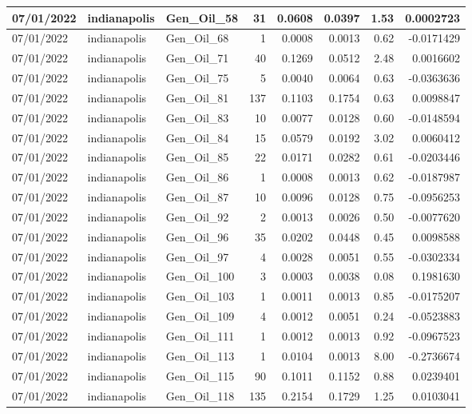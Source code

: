 \documentclass[
  letterpaper,
  DIV=11,
  numbers=noendperiod]{scrartcl}
\begin{document}
\begin{tabular}{l|l|l|r|r|r|r|r}
\hline
07/01/2022 & indianapolis & Gen\_Oil\_58 & 31 & 0.0608 & 0.0397 & 1.53 & 0.0002723\\
\hline
07/01/2022 & indianapolis & Gen\_Oil\_68 & 1 & 0.0008 & 0.0013 & 0.62 & -0.0171429\\
\hline
07/01/2022 & indianapolis & Gen\_Oil\_71 & 40 & 0.1269 & 0.0512 & 2.48 & 0.0016602\\
\hline
07/01/2022 & indianapolis & Gen\_Oil\_75 & 5 & 0.0040 & 0.0064 & 0.63 & -0.0363636\\
\hline
07/01/2022 & indianapolis & Gen\_Oil\_81 & 137 & 0.1103 & 0.1754 & 0.63 & 0.0098847\\
\hline
07/01/2022 & indianapolis & Gen\_Oil\_83 & 10 & 0.0077 & 0.0128 & 0.60 & -0.0148594\\
\hline
07/01/2022 & indianapolis & Gen\_Oil\_84 & 15 & 0.0579 & 0.0192 & 3.02 & 0.0060412\\
\hline
07/01/2022 & indianapolis & Gen\_Oil\_85 & 22 & 0.0171 & 0.0282 & 0.61 & -0.0203446\\
\hline
07/01/2022 & indianapolis & Gen\_Oil\_86 & 1 & 0.0008 & 0.0013 & 0.62 & -0.0187987\\
\hline
07/01/2022 & indianapolis & Gen\_Oil\_87 & 10 & 0.0096 & 0.0128 & 0.75 & -0.0956253\\
\hline
07/01/2022 & indianapolis & Gen\_Oil\_92 & 2 & 0.0013 & 0.0026 & 0.50 & -0.0077620\\
\hline
07/01/2022 & indianapolis & Gen\_Oil\_96 & 35 & 0.0202 & 0.0448 & 0.45 & 0.0098588\\
\hline
07/01/2022 & indianapolis & Gen\_Oil\_97 & 4 & 0.0028 & 0.0051 & 0.55 & -0.0302334\\
\hline
07/01/2022 & indianapolis & Gen\_Oil\_100 & 3 & 0.0003 & 0.0038 & 0.08 & 0.1981630\\
\hline
07/01/2022 & indianapolis & Gen\_Oil\_103 & 1 & 0.0011 & 0.0013 & 0.85 & -0.0175207\\
\hline
07/01/2022 & indianapolis & Gen\_Oil\_109 & 4 & 0.0012 & 0.0051 & 0.24 & -0.0523883\\
\hline
07/01/2022 & indianapolis & Gen\_Oil\_111 & 1 & 0.0012 & 0.0013 & 0.92 & -0.0967523\\
\hline
07/01/2022 & indianapolis & Gen\_Oil\_113 & 1 & 0.0104 & 0.0013 & 8.00 & -0.2736674\\
\hline
07/01/2022 & indianapolis & Gen\_Oil\_115 & 90 & 0.1011 & 0.1152 & 0.88 & 0.0239401\\
\hline
07/01/2022 & indianapolis & Gen\_Oil\_118 & 135 & 0.2154 & 0.1729 & 1.25 & 0.0103041\\

\end{tabular}
\end{document}
